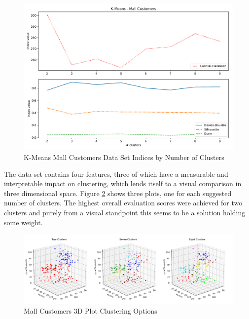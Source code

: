 \begin{figure}[H]
\begin{center}
\includegraphics[width=1.0\textwidth]{images/kmeans_customers_index_plot.pdf}
\end{center}
\caption{K-Means Mall Customers Data Set Indices by Number of Clusters}
\label{fig:kmeans_customers_indices_plot}
\end{figure}

The data set contains four features, three of which have a measurable and interpretable impact on clustering, which lends itself to a visual comparison in three dimensional space. Figure \ref{fig:kmeans_customers_3d_multi} shows three plots, one for each suggested number of clusters. The highest overall evaluation scores were achieved for two clusters and purely from a visual standpoint this seems to be a solution holding some weight. 

\begin{figure}[H]
\begin{center}
\includegraphics[width=1.0\textwidth]{images/kmeans_mall_3d_multi.pdf}
\end{center}
\caption{Mall Customers 3D Plot Clustering Options}
\label{fig:kmeans_customers_3d_multi}
\end{figure}
\vspace{-0.5cm}

